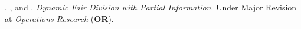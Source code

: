 \item {}, , and . \textit{Dynamic Fair Division with Partial Information}. Under Major Revision at \textit{Operations Research} (\textbf{OR}).

